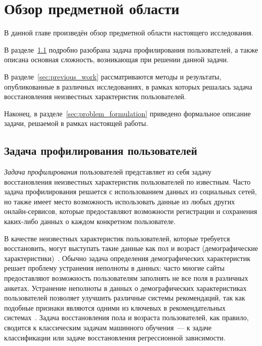 \chapter{Обзор предметной области}
\label{ch:chapter1}

В данной главе произведён обзор предметной области настоящего
исследования.

В разделе~\ref{sec:profiling_problem} подробно разобрана задача
профилирования пользователей, а также описана основная сложность,
возникающая при решении данной задачи.

В разделе~\ref{sec:previous_work} рассматриваются методы и
результаты, опубликованные в различных исследованиях, в рамках
которых решалась задача восстановления неизвестных характеристик
пользователей.

Наконец, в разделе~\ref{sec:problem_formulation} приведено
формальное описание задачи, решаемой в рамках настоящей
работы.

\section{Задача профилирования пользователей}
\label{sec:profiling_problem}

\textit{Задача профилирования} пользователей представляет из себя
задачу восстановления неизвестных характеристик пользователей
по известным. Часто задача профилирования решается с
использованием данных из социальных сетей, но также имеет
место возможность использовать данные из любых других
онлайн-сервисов, которые предоставляют возможности
регистрации и сохранения каких-либо данных о каждом
конкретном пользователе.

В качестве неизвестных характеристик пользователей,
которые требуется восстановить, могут выступать такие данные как пол и 
возраст (демографические характеристики)~\cite{burger2006exploration,
peersman2011predicting,turdakov2013opredelenie,schwartz2013personality,
rosenthal2011age,liu2012inferring,baluja2007boosting}. Обычно задача
определения демографических характеристик решает проблему устранения
неполноты в данных: часто многие сайты предоставляют возможность
пользователям заполнять не все поля в различных анкетах. 
Устранение неполноты в данных о демографических характеристиках
пользователей позволяет улучшить различные системы рекомендаций,
так как подобные признаки являются одними из ключевых в
рекомендательных системах~\cite{swearingen2001beyond,adomavicius2005toward}.
Задача восстановления пола и возраста пользователей, как правило,
сводится к классическим задачам машинного обучения~--- к
задаче классификации или задаче восстановления регрессионной зависимости.

